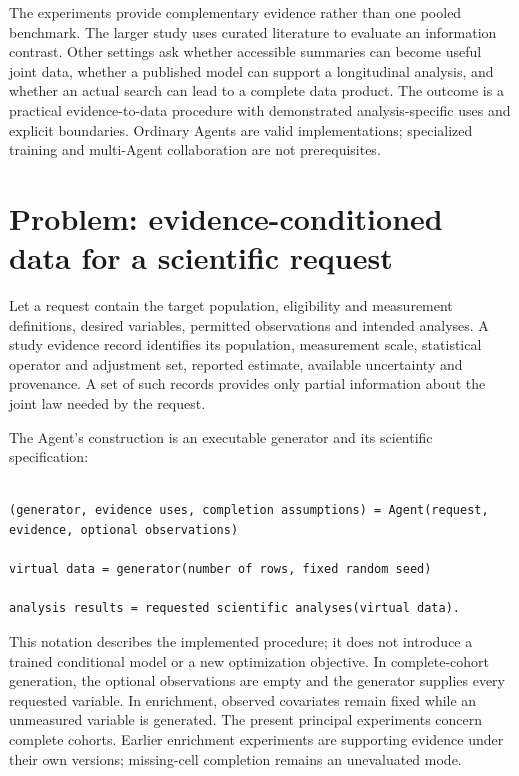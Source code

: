 \documentclass[10pt,twocolumn]{article}
\begin{document}
The experiments provide complementary evidence rather than one pooled benchmark. The larger study uses curated literature to evaluate an information contrast. Other settings ask whether accessible summaries can become useful joint data, whether a published model can support a longitudinal analysis, and whether an actual search can lead to a complete data product. The outcome is a practical evidence-to-data procedure with demonstrated analysis-specific uses and explicit boundaries. Ordinary Agents are valid implementations; specialized training and multi-Agent collaboration are not prerequisites.


\section{Problem: evidence-conditioned data for a scientific request}

Let a request contain the target population, eligibility and measurement definitions, desired variables, permitted observations and intended analyses. A study evidence record identifies its population, measurement scale, statistical operator and adjustment set, reported estimate, available uncertainty and provenance. A set of such records provides only partial information about the joint law needed by the request.


The Agent's construction is an executable generator and its scientific specification:


\begin{lstlisting}

(generator, evidence uses, completion assumptions) = Agent(request, evidence, optional observations)

virtual data = generator(number of rows, fixed random seed)

analysis results = requested scientific analyses(virtual data).

\end{lstlisting}

This notation describes the implemented procedure; it does not introduce a trained conditional model or a new optimization objective. In complete-cohort generation, the optional observations are empty and the generator supplies every requested variable. In enrichment, observed covariates remain fixed while an unmeasured variable is generated. The present principal experiments concern complete cohorts. Earlier enrichment experiments are supporting evidence under their own versions; missing-cell completion remains an unevaluated mode.
\end{document}
